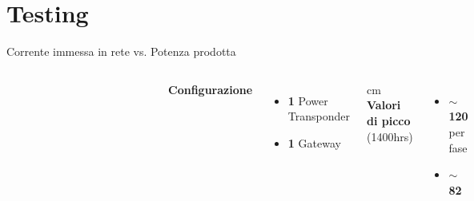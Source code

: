 \documentclass{beamer}
\newcommand{\bigtilde}{$\sim$}
\newcommand{\N}{\vskip 0.3 cm}
\begin{document}
\section{Testing}
\begin{frame}{Corrente immessa in rete vs. Potenza prodotta}
  \begin{columns}
    \column{2.5in}
    \begin{figure}[!h]
      \begin{center}
      \end{center}
    \end{figure}
    \begin{figure}[!h]
      \begin{center}
      \end{center}
    \end{figure}
    \column{1.7in}
    \textbf{Configurazione}
    \begin{itemize}
    \item \textbf{1} Power Transponder
    \item \textbf{1} Gateway
    \end{itemize}
    \N
    \textbf{Valori di picco} (1400hrs)
    \begin{itemize}
    \item \textbf{\bigtilde{} 120 \ampere} per fase
    \item \textbf{\bigtilde{} 82 \kilo\watt}
    \end{itemize}
    
  \end{columns}
\end{frame}
%
\end{document}

